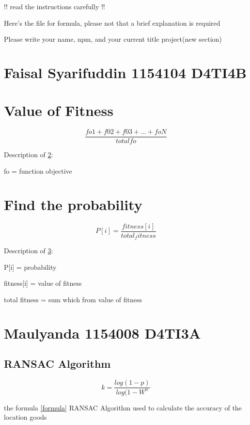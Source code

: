 !! read the instructions carefully !!

Here's the file for formula, please not that a brief explanation is required

Please write your name, npm, and your current title project(new section)



\section{Faisal Syarifuddin 1154104 D4TI4B}



\section{Value of Fitness}
    \label{fitness}
    \begin{equation}
        \frac{fo1 + f02 + f03 + ... + foN}{total fo}
    \end{equation}
    \par Description of \ref{fitness}:
    \par fo = function objective

\section{Find the probability}
    \label{ptobabilty}
    \begin{equation}
        P[i] = \frac{fitness[i]}{total_fitness}
    \end{equation}
    \par Description of \ref{ptobabilty}:
    \par P[i] = probability
    \par fitness[i] = value of fitness
    \par total fitness = sum which from value of fitness

\section{Maulyanda 1154008 D4TI3A}
\subsection{RANSAC Algorithm}
    \label{Formula}
    \begin{equation}
        k = \frac{log(1-p)}{log(1-W^n}
    \end{equation}

    the formula \ref{formula} RANSAC Algorithm used to calculate the accuracy of the location goods

